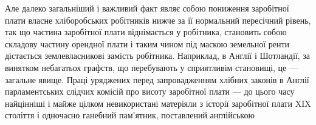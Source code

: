 Але далеко загальніший і важливий факт являє собою пониження заробітної
плати власне хліборобських робітників нижче за її нормальний пересічний
рівень, так що частина заробітної плати віднімається у робітника, становить
собою складову частину орендної плати і таким чином під маскою земельної ренти
дістається землевласникові замість робітника. Наприклад, в Англії і Шотландії,
за винятком небагатьох графств, що перебувають у сприятливім становищі,
це — загальне явище. Праці уряджених перед запровадженням хлібних законів
в Англії парламентських слідчих комісій про висоту заробітної плати — до цього
часу найцінніші і майже цілком невикористані матеріяли з історії заробітної
плати XIX століття і одночасно ганебний пам’ятник, поставлений англійською